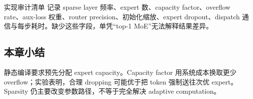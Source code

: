 \begin{importantbox}{实现审计清单}
记录 sparse layer 频率、expert 数、capacity factor、overflow rate、aux-loss 权重、router precision、初始化缩放、expert dropout、dispatch 通信与每步耗时。缺少这些字段，单凭“top-1 MoE”无法解释结果差异。
\end{importantbox}

\subsection{本章小结}

静态编译要求预先分配 expert capacity。Capacity factor 用系统成本换取更少 overflow；实验表明，合理 dropping 可能优于把 token 强制送往次优 expert。Sparsity 仍主要改变参数路径，不等于完全解决 adaptive computation。


